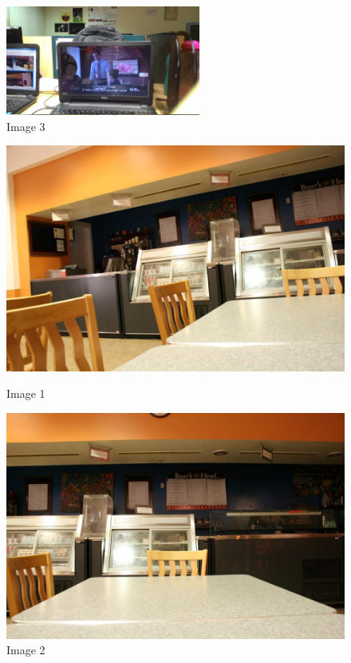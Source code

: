 \documentclass[12pt]{article}
\begin{document}
\begin{figure}[htp]
\centering
\includegraphics[width=0.57\textwidth]{pt3.jpg}\hfill
\caption{Image 3}
\end{figure}
\clearpage


\begin{figure}[h]
\centering
\begin{minipage}{0.6\textwidth}
\centering
\includegraphics[scale = 0.2]{test5.jpg}
\caption{Image 1}
\label{fig:Image 1}
\end{minipage}%
\begin{minipage}{.5\textwidth}
\centering
\includegraphics[scale = 0.2]{test6.jpg}
\caption{Image 2}
\label{fig:Image 2}
\end{minipage}%
\end{figure}
\end{document}

